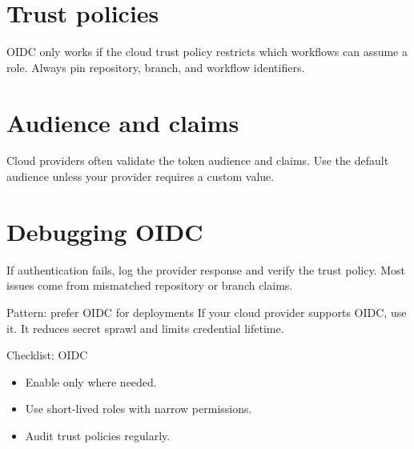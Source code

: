 \section{Trust policies}
OIDC only works if the cloud trust policy restricts which workflows can assume a role.
Always pin repository, branch, and workflow identifiers.

\section{Audience and claims}
Cloud providers often validate the token audience and claims.
Use the default audience unless your provider requires a custom value.

\section{Debugging OIDC}
If authentication fails, log the provider response and verify the trust policy.
Most issues come from mismatched repository or branch claims.

\begin{patternbox}{Pattern: prefer OIDC for deployments}
If your cloud provider supports OIDC, use it.
It reduces secret sprawl and limits credential lifetime.
\end{patternbox}

\begin{checklistbox}{Checklist: OIDC}
\begin{itemize}[nosep]
  \item Enable  only where needed.
  \item Use short-lived roles with narrow permissions.
  \item Audit trust policies regularly.
\end{itemize}
\end{checklistbox}
